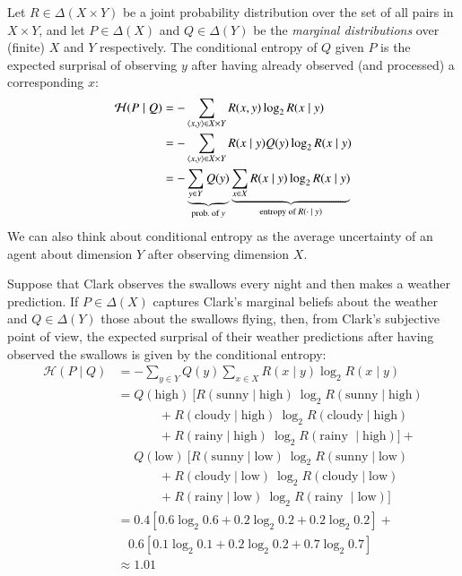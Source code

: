 \documentclass[nobib,nofonts]{tufte-handout}
\begin{document}
Let $R \in \Delta(X \times Y)$ be a joint probability distribution over the set of all pairs in $X \times Y$, and let $P \in \Delta(X)$ and $Q \in \Delta(Y)$ be the \emph{marginal distributions} over (finite) $X$ and $Y$ respectively.
The conditional entropy of $Q$ given $P$ is the expected surprisal of observing $y$ after having already observed (and processed) a corresponding $x$:
\begin{align*}
  \mathcal{H}(P \mid Q) & = - \sum_{\left \langle x,y\right\rangle \in X \times Y} R(x,y) \log_{2} R(x \mid y) \\
                        & = - \sum_{\left \langle x,y\right\rangle \in X \times Y} R(x \mid y) Q(y) \log_{2} R(x \mid y) \\
                        & = - \underbrace{\sum_{y \in Y} Q(y)}_{\text{prob.~of $y$}}
                          \underbrace{\sum_{x \in X} R(x \mid y) \log_{2} R(x \mid y)}_{\text{entropy of $R(\cdot \mid y)$}}
\end{align*}
We can also think about conditional entropy as the average uncertainty of an agent about dimension $Y$ after observing dimension $X$.

\begin{example}
  Suppose that Clark observes the swallows every night and then makes a weather prediction.
  If $P \in \Delta(X)$ captures Clark's marginal beliefs about the weather and $Q \in \Delta(Y)$ those about the swallows flying, then, from Clark's subjective point of view, the expected surprisal of their weather predictions after having observed the swallows is given by the conditional entropy:
  \begin{align*}
    \mathcal{H}(P \mid Q) & = - \sum_{y \in Y} Q(y)
                          \sum_{x \in X} R(x \mid y) \log_{2} R(x \mid y) \\
                          & = Q(\text{high}) \ [ R(\text{sunny} \mid \text{high}) \ \log_{2} R(\text{sunny} \mid \text{high})  \\
                          & \ \ \ \ \ \ \ \ \ \ \ \ \ \ \ + R(\text{cloudy} \mid \text{high}) \ \log_{2} R(\text{cloudy} \mid \text{high}) \\
                          & \ \ \ \ \ \ \ \ \ \ \ \ \ \ \ + R(\text{rainy} \mid \text{high}) \ \log_{2} R(\text{rainy } \mid \text{high}) ] + \\
                           &\ \ \  \ \ \ Q(\text{low}) \ [ R(\text{sunny} \mid \text{low}) \ \log_{2} R(\text{sunny} \mid \text{low})  \\
                          & \ \ \ \ \ \ \ \ \ \ \ \ \ \ \ + R(\text{cloudy} \mid \text{low}) \ \log_{2} R(\text{cloudy} \mid \text{low}) \\
                          & \ \ \ \ \ \ \ \ \ \ \ \ \ \ \ + R(\text{rainy} \mid \text{low}) \ \log_{2} R(\text{rainy } \mid \text{low}) ] \\
                          & = 0.4 [0.6 \log_{2} 0.6 +  0.2 \log_{2} 0.2 + 0.2 \log_{2} 0.2] + \\
                          & \ \ \ \ 0.6 [0.1 \log_{2} 0.1 +  0.2 \log_{2} 0.2 + 0.7 \log_{2} 0.7] \\
     & \approx 1.01
  \end{align*}
\end{example}
\end{document}

